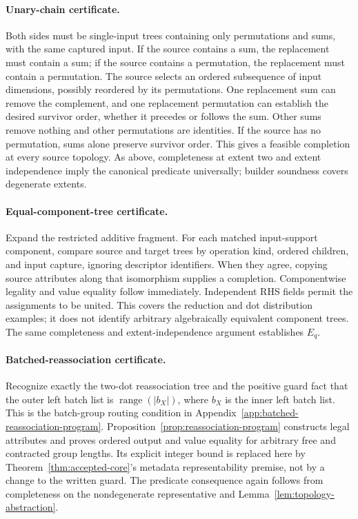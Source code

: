 \paragraph{Unary-chain certificate.}
Both sides must be single-input trees containing only permutations and
sums, with the same captured input. If the source contains a sum, the
replacement must contain a sum; if the source contains a permutation, the
replacement must contain a permutation. The source selects an ordered
subsequence of input dimensions, possibly reordered by its permutations. One
replacement sum can remove the complement, and one replacement permutation
can establish the desired survivor order, whether it precedes or follows
the sum. Other sums remove nothing and other permutations are identities.
If the source has no permutation, sums alone preserve survivor order.
This gives a feasible completion at every source topology. As above,
completeness at extent two and extent independence imply the canonical
predicate universally; builder soundness covers degenerate extents.

\paragraph{Equal-component-tree certificate.}
Expand the restricted additive fragment. For each matched input-support
component, compare source and target trees by operation kind, ordered
children, and input capture, ignoring descriptor identifiers. When they
agree, copying source attributes along that isomorphism supplies a
completion. Componentwise legality and value equality follow immediately.
Independent RHS fields permit the assignments to be united. This covers
the reduction and dot distribution examples; it does not identify
arbitrary algebraically equivalent component trees. The same completeness
and extent-independence argument establishes $E_q$.

\paragraph{Batched-reassociation certificate.}
Recognize exactly the two-dot reassociation tree and the positive guard
fact that the outer left batch list is
$\operatorname{range}(|b_X|)$, where $b_X$ is the inner left batch list.
This is the batch-group routing condition in
Appendix~\ref{app:batched-reassociation-program}. Proposition~\ref{prop:reassociation-program}
constructs legal attributes and proves ordered output and value equality
for arbitrary free and contracted group lengths. Its explicit integer
bound is replaced here by Theorem~\ref{thm:accepted-core}'s metadata
representability premise, not by a change to the written guard.
The predicate consequence again follows from completeness on the
nondegenerate representative and Lemma~\ref{lem:topology-abstraction}.

